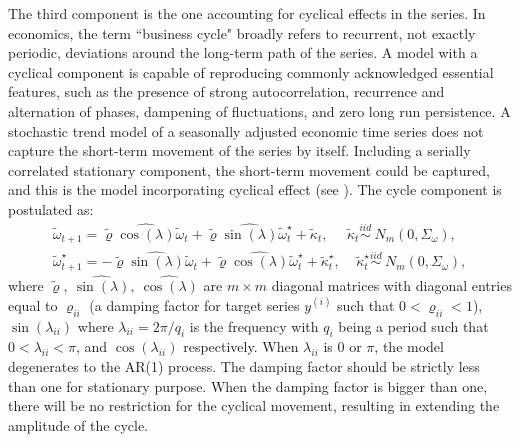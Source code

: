 \documentclass[twoside,11pt]{article}
\begin{document}
The third component is the one accounting for cyclical effects in the series. In economics, the term ``business cycle" broadly refers to recurrent, not exactly periodic, deviations around the long-term path of the series. A model with a cyclical component is capable of reproducing commonly acknowledged essential features, such as the presence of strong autocorrelation, recurrence and alternation of phases, dampening of fluctuations, and zero long run persistence. A stochastic trend model of a seasonally adjusted economic time series does not capture the
short-term movement of the series by itself. Including a serially correlated stationary component, the short-term movement could be captured, and this is the model incorporating cyclical effect (see \citealp{harvey2007trends}). The cycle component is postulated as:
\begin{equation} \label{eq:cycle}
\begin{gathered}
\tilde{\omega}_{t+1}=\tilde{\varrho}\widehat{\cos(\lambda)}\tilde{\omega}_{t}+\tilde{\varrho} \widehat{\sin(\lambda)}\tilde{\omega}_{t}^\star+\tilde{\kappa}_t, \ \ \ \ \ \  \tilde{\kappa}_t\stackrel{iid}\sim \  N_m(0,\Sigma_\omega),\\
\tilde{\omega}_{t+1}^\star=-\tilde{\varrho}\widehat{\sin(\lambda)}\tilde{\omega}_{t}+\tilde{\varrho} \widehat{\cos(\lambda)}\tilde{\omega}_{t}^\star+\tilde{\kappa}_t^\star , \ \ \ \ \  \tilde{\kappa}_t^\star\stackrel{iid}\sim \  N_m(0,\Sigma_\omega),
\end{gathered}
\end{equation}
where $\tilde{\varrho},\ \widehat{\sin(\lambda)},\ \widehat{\cos(\lambda)}$ are $m\times m$ diagonal matrices with diagonal entries equal to $\varrho_{ii}$ (a damping factor  for target series $y^{(i)}$ such that $0<\varrho_{ii}<1$), $\sin(\lambda_{ii})$ where $\lambda_{ii}=2\pi/q_i$ is the frequency with $q_i$ being a period such that $0<\lambda_{ii}<\pi$, and $\cos(\lambda_{ii})$ respectively. When $\lambda_{ii}$ is $0$ or $\pi$, the model degenerates to the AR(1) process. The damping factor should be strictly less than one for stationary purpose. When the damping factor is bigger than one, there will be no restriction for the cyclical movement, resulting in extending the amplitude of the cycle.
\end{document}
